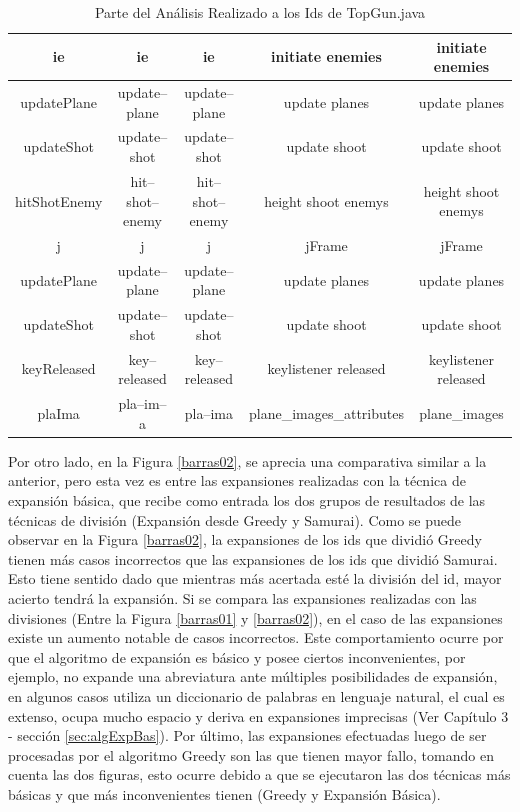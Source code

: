 \begin{table}
\begin{tabular}{| c | c | c | c | c |}
ie&ie&ie&initiate enemies&initiate enemies\\ \hline
updatePlane&update--plane&update--plane&update planes&update planes\\ \hline
updateShot&update--shot&update--shot&update shoot&update shoot\\ \hline
hitShotEnemy&hit--shot--enemy&hit--shot--enemy&height shoot enemys&height shoot enemys\\ \hline
j&j&j&jFrame&jFrame\\ \hline
updatePlane&update--plane&update--plane&update planes&update planes\\ \hline
updateShot&update--shot&update--shot&update shoot&update shoot\\ \hline
keyReleased&key--released&key--released&keylistener released&keylistener released\\ \hline
plaIma&pla--im--a&pla--ima&plane\_images\_attributes&plane\_images \\ \hline
   
   	\end{tabular}  
	 
   \caption{Parte del Análisis Realizado a los Ids de TopGun.java}
   \label{tabla7}
     
\end{table} 

\clearpage %



Por otro lado, en la Figura \ref{barras02}, se aprecia una comparativa similar a la anterior, pero esta vez es entre las expansiones realizadas con la técnica de expansión básica, que recibe como entrada los dos grupos de resultados de las técnicas de división (Expansión desde Greedy y Samurai). Como se puede observar en la Figura \ref{barras02}, la expansiones de los ids que dividió Greedy tienen más casos incorrectos que las expansiones de los ids que dividió Samurai. Esto tiene sentido dado que mientras más acertada esté la división del id, mayor acierto tendrá la expansión. Si se compara las expansiones realizadas con las divisiones (Entre la Figura \ref{barras01} y \ref{barras02}), en el caso de las expansiones existe un aumento notable de casos incorrectos. 
Este comportamiento ocurre por que el algoritmo de expansión es básico y posee ciertos inconvenientes, por ejemplo, no expande una abreviatura ante múltiples posibilidades de expansión, en algunos casos utiliza un diccionario de palabras en lenguaje natural, el cual es extenso, ocupa mucho espacio y deriva en expansiones imprecisas (Ver Capítulo 3 - sección \ref{sec:algExpBas}).
Por último, las expansiones efectuadas luego de ser procesadas por el algoritmo Greedy son las que tienen mayor fallo, tomando en cuenta las dos figuras, esto ocurre debido a que se ejecutaron las dos técnicas más básicas y que más inconvenientes tienen (Greedy y Expansión Básica).

